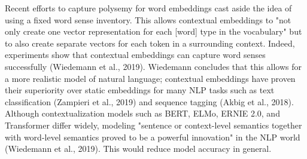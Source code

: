 Recent efforts to capture polysemy for word embeddings cast aside the idea of using a fixed word sense inventory. This allows contextual embeddings to "not only create one vector representation for each [word] type in the vocabulary" but to also create separate vectors for each token in a surrounding context. Indeed, experiments show that contextual embeddings can capture word senses successfully (Wiedemann et al., 2019). Wiedemann concludes that this allows for a more realistic model of natural language; contextual embeddings have proven their superiority over static embeddings for many NLP tasks such as text classification (Zampieri et al., 2019) and sequence tagging (Akbig et al., 2018). Although contextualization models such as BERT, ELMo, ERNIE 2.0, and Transformer differ widely, modeling "sentence or context-level semantics together with word-level semantics proved to be a powerful innovation" in the NLP world (Wiedemann et al., 2019). This would reduce model accuracy in general. 


